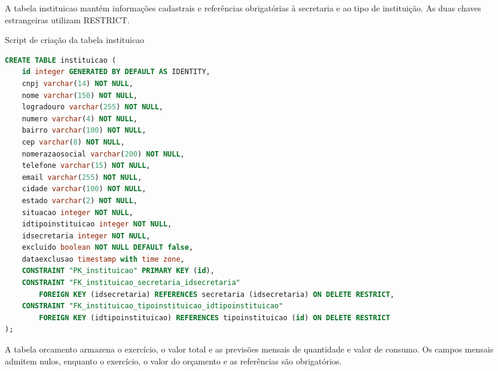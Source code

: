 A tabela instituicao mantém informações cadastrais e referências obrigatórias à secretaria e ao tipo de instituição. As duas chaves estrangeiras utilizam RESTRICT.

\begin{quadro}[H]
\caption{Script de criação da tabela instituicao}\label{qua:bd-instituicao}
\begin{lstlisting}[language=SQL,breaklines=true,breakatwhitespace=false,frame=single,columns=fullflexible,basicstyle=\ttfamily\footnotesize]
CREATE TABLE instituicao (
    id integer GENERATED BY DEFAULT AS IDENTITY,
    cnpj varchar(14) NOT NULL,
    nome varchar(150) NOT NULL,
    logradouro varchar(255) NOT NULL,
    numero varchar(4) NOT NULL,
    bairro varchar(100) NOT NULL,
    cep varchar(8) NOT NULL,
    nomerazaosocial varchar(200) NOT NULL,
    telefone varchar(15) NOT NULL,
    email varchar(255) NOT NULL,
    cidade varchar(100) NOT NULL,
    estado varchar(2) NOT NULL,
    situacao integer NOT NULL,
    idtipoinstituicao integer NOT NULL,
    idsecretaria integer NOT NULL,
    excluido boolean NOT NULL DEFAULT false,
    dataexclusao timestamp with time zone,
    CONSTRAINT "PK_instituicao" PRIMARY KEY (id),
    CONSTRAINT "FK_instituicao_secretaria_idsecretaria"
        FOREIGN KEY (idsecretaria) REFERENCES secretaria (idsecretaria) ON DELETE RESTRICT,
    CONSTRAINT "FK_instituicao_tipoinstituicao_idtipoinstituicao"
        FOREIGN KEY (idtipoinstituicao) REFERENCES tipoinstituicao (id) ON DELETE RESTRICT
);
\end{lstlisting}
\end{quadro}

A tabela orcamento armazena o exercício, o valor total e as previsões mensais de quantidade e valor de consumo. Os campos mensais admitem nulos, enquanto o exercício, o valor do orçamento e as referências são obrigatórios.

